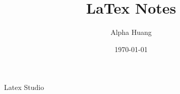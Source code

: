 \documentclass{article}
\begin{document}
	\title{LaTex Notes}
	\author{Alpha Huang}
	\date{\today}
	\maketitle
	Latex Studio
\end{document}
